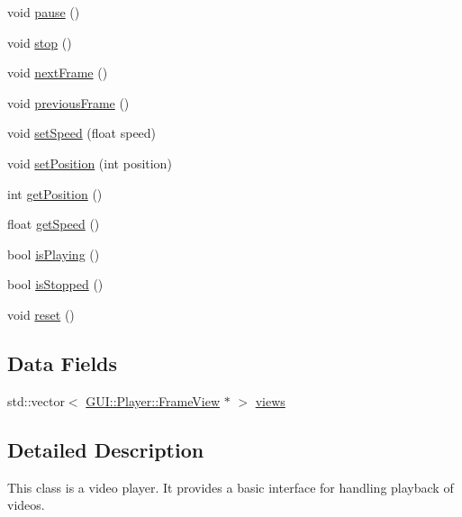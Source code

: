 \begin{DoxyCompactItemize}
\item 
void \hyperlink{classGUI_1_1Player_1_1VideoPlayer_a7167f5c196fc5e167bfabde1a730e81d}{pause} ()
\item 
void \hyperlink{classGUI_1_1Player_1_1VideoPlayer_a8c528baf37154d347366083f0f816846}{stop} ()
\item 
void \hyperlink{classGUI_1_1Player_1_1VideoPlayer_a365329da56f8b07f8c95027ba967bbc3}{next\+Frame} ()
\item 
void \hyperlink{classGUI_1_1Player_1_1VideoPlayer_a3c96ed37c70ebc0b32c527a04e1536d1}{previous\+Frame} ()
\item 
void \hyperlink{classGUI_1_1Player_1_1VideoPlayer_a5466c67c5ec22359c0702dc4ac8ffb19}{set\+Speed} (float speed)
\item 
void \hyperlink{classGUI_1_1Player_1_1VideoPlayer_a1aa68f77243229daea38d59bc5145d35}{set\+Position} (int position)
\item 
int \hyperlink{classGUI_1_1Player_1_1VideoPlayer_a97825791568ee242ca19d25b75030d87}{get\+Position} ()
\item 
float \hyperlink{classGUI_1_1Player_1_1VideoPlayer_a26ebefde7fe71954e6c1282255951b7d}{get\+Speed} ()
\item 
bool \hyperlink{classGUI_1_1Player_1_1VideoPlayer_a8438e3403946accc1986a05b89ee7b03}{is\+Playing} ()
\item 
bool \hyperlink{classGUI_1_1Player_1_1VideoPlayer_a2fc5ff4f369aaa46c55c3ad3c63216d6}{is\+Stopped} ()
\item 
void \hyperlink{classGUI_1_1Player_1_1VideoPlayer_ad20897c5c8bd47f5d4005989bead0e55}{reset} ()
\end{DoxyCompactItemize}
\subsection*{Data Fields}
\begin{DoxyCompactItemize}
\item 
std\+::vector$<$ \hyperlink{classGUI_1_1Player_1_1FrameView}{G\+U\+I\+::\+Player\+::\+Frame\+View} $\ast$ $>$ \hyperlink{classGUI_1_1Player_1_1VideoPlayer_aa8ce1e924e51a9cf880fbf841665ad4b}{views}
\end{DoxyCompactItemize}


\subsection{Detailed Description}
This class is a video player. It provides a basic interface for handling playback of videos. 


